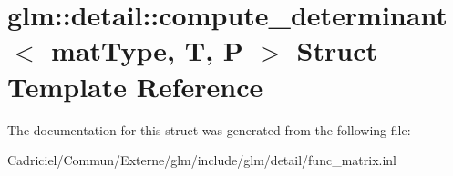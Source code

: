 \hypertarget{structglm_1_1detail_1_1compute__determinant}{}\section{glm\+:\+:detail\+:\+:compute\+\_\+determinant$<$ mat\+Type, T, P $>$ Struct Template Reference}
\label{structglm_1_1detail_1_1compute__determinant}


The documentation for this struct was generated from the following file\+:\begin{DoxyCompactItemize}
\item 
Cadriciel/\+Commun/\+Externe/glm/include/glm/detail/func\+\_\+matrix.\+inl\end{DoxyCompactItemize}
